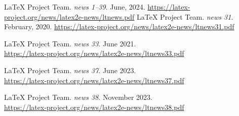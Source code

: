 \documentclass{ltnews}
\providecommand\Dash {\unskip \textemdash}
\begin{document}
\begin{thebibliography}{9}



%

 \LaTeX{} Project Team.
  \emph{\LaTeXe{} news 1--39}. June, 2024.
  \url{https://latex-project.org/news/latex2e-news/ltnews.pdf}
%
%
 \LaTeX{} Project Team.
  \emph{\LaTeXe{} news 31}. February, 2020.
  \url{https://latex-project.org/news/latex2e-news/ltnews31.pdf}

 \LaTeX{} Project Team.
  \emph{\LaTeXe{} news 33}. June 2021.\\
  \url{https://latex-project.org/news/latex2e-news/ltnews33.pdf}

 \LaTeX{} Project Team.
  \emph{\LaTeXe{} news 37}. June 2023.\\
  \url{https://latex-project.org/news/latex2e-news/ltnews37.pdf}

 \LaTeX{} Project Team.
  \emph{\LaTeXe{} news 38}. November 2023.\\
  \url{https://latex-project.org/news/latex2e-news/ltnews38.pdf}


\end{thebibliography}
\end{document}
